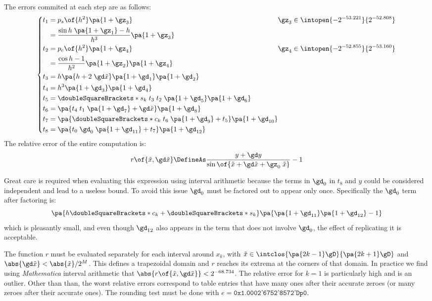 \documentclass[10pt, a4paper, twoside]{basestyle}
\newcommand{\round}[1]{\doubleSquareBrackets*{#1}}
\newcommand{\red}[1]{\tilde{#1}}
\begin{document}
The errors commited at each step are as follows:
\[
\left\{
\begin{alignedat}{2}
t_1 &= p_s\of{h^2} \pa{1 + \gz_3} \qquad & \gz_3 \in \intopen{-2^{-53.221}}{2^{-52.808}} \\
&= \frac{\sin h \; \pa{1 + \gz_1} - h}{h^3} \pa{1 + \gz_3} \\
t_2 &= p_c\of{h^2} \pa{1 + \gz_4} \qquad & \gz_4 \in \intopen{-2^{-52.855}}{2^{-53.160}} \\
&= \frac{\cos h - 1}{h^2} \pa{1 + \gz_2} \pa{1 + \gz_4} \\
t_3 &= h \pa{h + 2 \; \gd \red x} \pa{1 + \gd_1} \pa{1 + \gd_2} \\
t_4 &= h^3 \pa{1 + \gd_3} \pa{1 + \gd_4} \\
t_5 &= \round{s_k} \; t_3 \; t_2 \; \pa{1 + \gd_5} \pa{1 + \gd_6} \\
t_6 &= \pa{t_4 \; t_1 \; \pa{1 + \gd_7} + \gd \red x} \pa{1 + \gd_8} \\
t_7 &= \pa{\round{c_k} \; t_6 \; \pa{1 + \gd_9} + t_5} \pa{1 + \gd_{10}} \\
t_8 &= \pa{t_0 \; \gd_0 \; \pa{1 + \gd_{11}} + t_7} \pa{1 + \gd_{12}} \\
\end{alignedat}
\right.
\]
The relative error of the entire computation is:
\[
r\of{\red x, \gd \red x} \DefineAs \frac{y + \gd y}{\sin\of{\red x + \gd \red x + \gz_0 \; \red x}} - 1
\]

Great care is required when evaluating this expression using interval arithmetic because the terms in $\gd_0$ in $t_8$ and $y$ could be considered independent and lead to a useless bound.  To avoid this issue $\gd_0$ must be factored out to appear only once.  Specifically the $\gd_0$ term after factoring is:
\[
\pa{h \round{c_k} + \round{s_k}} \pa{\pa{1 + \gd_{11}} \pa{1 + \gd_{12}} - 1}
\]
which is pleasantly small, and even though $\gd_{12}$ also appears in the term that does not involve $\gd_0$, the effect of replicating it is acceptable.

The function $r$ must be evaluated separately for each interval around $x_k$, with $\red x \in \intclos{\pa{2 k - 1}\gD}{\pa{2 k + 1}\gD}$ and $\abs{\gd \red x} < {\abs{\red x}} / 2^M$.  This defines a trapezoidal domain and $r$ reaches its extrema at the corners of that domain.  In practice we find using \textit{Mathematica} interval arithmetic that $\abs{r\of{\red x, \gd \red x}} < 2^{-68.734}$.  The relative error for $k = 1$ is particularly high and is an outlier.  Other than than, the worst relative errors correspond to table entries that have many ones after their accurate zeroes (or many zeroes after their accurate ones).  The rounding test must be done with $e = \texttt{0x1.0002'6752'8572'Dp0}$.
\end{document}
